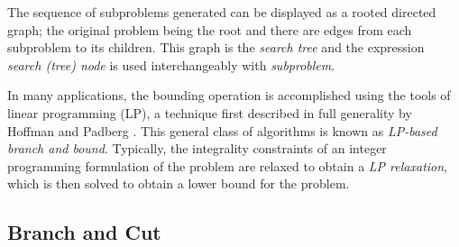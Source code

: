 

The sequence of subproblems generated can be displayed as a rooted directed
graph; the original problem being the root and there are edges from each
subproblem to its children. This graph is the {\em search tree} and the
expression {\em search (tree) node} is used interchangeably with 
{\em subproblem}.

In many applications, the bounding operation is accomplished using the
tools of linear programming (LP), a technique first described in full
generality by Hoffman and Padberg \cite{A:hoffman-padberg}. This general 
class of 
algorithms is known as {\em LP-based branch and bound}. Typically, the
integrality constraints of an integer programming formulation of the
problem are relaxed to obtain a {\em LP relaxation}, which is then
solved to obtain a lower bound for the problem.

\subsection{Branch and Cut}
\label{branchandcut}

